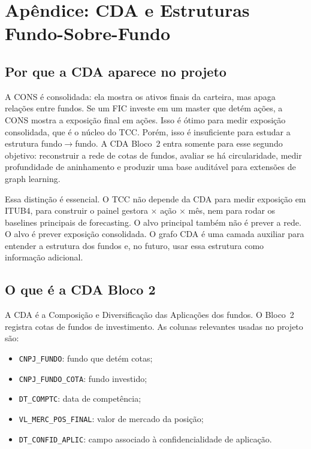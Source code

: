 \documentclass[12pt,a4paper]{report}
\begin{document}
\appendix
\chapter{Apêndice: CDA e Estruturas Fundo-Sobre-Fundo}\label{ap:cda}

\section{Por que a CDA aparece no projeto}

A CONS é consolidada: ela mostra os ativos finais da carteira, mas apaga relações entre fundos. Se um FIC
investe em um master que detém ações, a CONS mostra a exposição final em ações. Isso é ótimo para medir
exposição consolidada, que é o núcleo do TCC. Porém, isso é insuficiente para estudar a estrutura
fundo$\to$fundo. A CDA Bloco~2 entra somente para esse segundo objetivo: reconstruir a rede de cotas de
fundos, avaliar se há circularidade, medir profundidade de aninhamento e produzir uma base auditável para
extensões de graph learning.

Essa distinção é essencial. O TCC não depende da CDA para medir exposição em ITUB4, para construir o painel
gestora $\times$ ação $\times$ mês, nem para rodar os baselines principais de forecasting. O alvo principal
também não é prever a rede. O alvo é prever exposição consolidada. O grafo CDA é uma camada auxiliar para
entender a estrutura dos fundos e, no futuro, usar essa estrutura como informação adicional.

\section{O que é a CDA Bloco 2}

A CDA é a Composição e Diversificação das Aplicações dos fundos. O Bloco~2 registra cotas de fundos de
investimento. As colunas relevantes usadas no projeto são:
\begin{itemize}
\item \texttt{CNPJ\_FUNDO}: fundo que detém cotas;
\item \texttt{CNPJ\_FUNDO\_COTA}: fundo investido;
\item \texttt{DT\_COMPTC}: data de competência;
\item \texttt{VL\_MERC\_POS\_FINAL}: valor de mercado da posição;
\item \texttt{DT\_CONFID\_APLIC}: campo associado à confidencialidade de aplicação.
\end{itemize}
\end{document}
